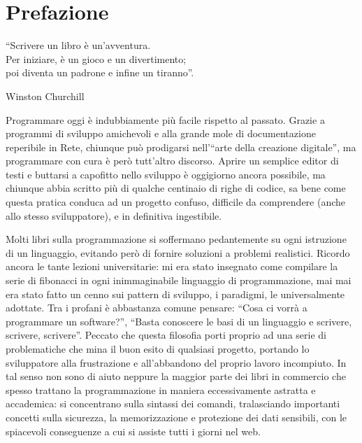 
{}
\section*{Prefazione}
\label{cap:prefazione}

\epigraph{``Scrivere un libro è un'avventura.\\
Per iniziare, è un gioco e un divertimento; \\
poi diventa un padrone e infine un tiranno''.}%
{Winston Churchill}

Programmare oggi è indubbiamente più facile rispetto al passato. Grazie a programmi di sviluppo amichevoli e alla grande mole di documentazione reperibile in Rete, chiunque può prodigarsi nell'``arte della creazione digitale'', ma programmare con cura è però tutt'altro discorso. Aprire un semplice editor di testi e buttarsi a capofitto nello sviluppo è oggigiorno ancora possibile, ma chiunque abbia scritto più di qualche centinaio di righe di codice, sa bene come questa pratica conduca ad un progetto confuso, difficile da comprendere (anche allo stesso sviluppatore), e in definitiva ingestibile.

Molti libri sulla programmazione si soffermano pedantemente su ogni istruzione di un linguaggio, evitando però di fornire soluzioni a problemi realistici. Ricordo ancora le tante lezioni universitarie: mi era stato insegnato come compilare la serie di fibonacci in ogni inimmaginabile linguaggio di programmazione, mai mai era stato fatto un cenno sui pattern di sviluppo, i paradigmi, le  universalmente adottate. Tra i profani è abbastanza comune pensare: ``Cosa ci vorrà a programmare un software?'', ``Basta conoscere le basi di un linguaggio e scrivere, scrivere, scrivere''. Peccato che questa filosofia porti proprio ad una serie di problematiche che mina il buon esito di qualsiasi progetto, portando lo sviluppatore alla frustrazione e all'abbandono del proprio lavoro incompiuto. In tal senso non sono di aiuto neppure la maggior parte dei libri in commercio che spesso trattano la programmazione in maniera eccessivamente astratta e accademica: si concentrano sulla sintassi dei comandi, tralasciando importanti concetti sulla sicurezza, la memorizzazione e protezione dei dati sensibili, con le spiacevoli conseguenze a cui si assiste tutti i giorni nel web.

